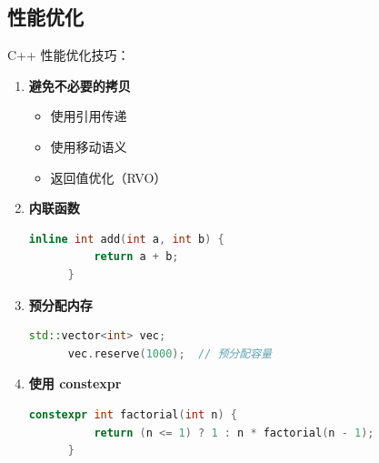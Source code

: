 \subsection{性能优化}


C++ 性能优化技巧：

\begin{enumerate}
  \item \textbf{避免不必要的拷贝}
    \begin{itemize}
      \item 使用引用传递
      \item 使用移动语义
      \item 返回值优化（RVO）
    \end{itemize}

  \item \textbf{内联函数}
    \begin{lstlisting}[language=C++]
      inline int add(int a, int b) {
          return a + b;
      }
    \end{lstlisting}

  \item \textbf{预分配内存}
    \begin{lstlisting}[language=C++]
      std::vector<int> vec;
      vec.reserve(1000);  // 预分配容量
    \end{lstlisting}

  \item \textbf{使用 constexpr}
    \begin{lstlisting}[language=C++]
      constexpr int factorial(int n) {
          return (n <= 1) ? 1 : n * factorial(n - 1);
      }
    \end{lstlisting}
\end{enumerate}
